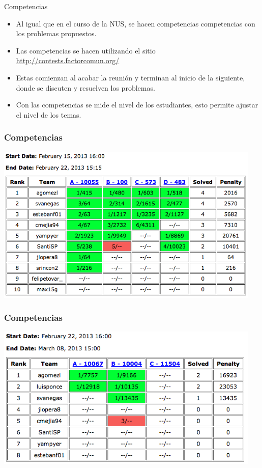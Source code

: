 \documentclass{beamer}
\begin{document}
	\begin{frame}{Competencias}
		\begin{itemize}
			\item Al igual que en el curso de la NUS, se hacen competencias competencias con los problemas propuestos.
			\item Las competencias se hacen utilizando el sitio \url{http://contests.factorcomun.org/}\\
			\item Estas comienzan al acabar la reunión y terminan al inicio de la siguiente, donde se discuten y resuelven los problemas.\\
			\item Con las competencias se mide el nivel de los estudiantes, esto permite ajustar el nivel de los temas.
		\end{itemize}
	\end{frame}
	
	
	\begin{frame}
		\frametitle{Competencias}
		\includegraphics[width = 0.95\textwidth]{contest.png}
	\end{frame}
	
	\begin{frame}
		\frametitle{Competencias}
		\includegraphics[width = 0.95\textwidth]{contest2.png}
	\end{frame}
\end{document}
